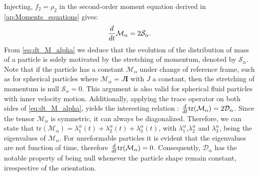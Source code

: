 Injecting, $f_2 = \rho_2$ in the second-order moment equation derived in \ref{ap:Moments_equations} gives:
\begin{equation}
    \frac{d}{d t} \mathcal{M}_\alpha=2\mathcal{S}_\alpha. 
    \label{eq:dt_M_alpha}
\end{equation}
From \ref{eq:dt_M_alpha} we deduce that the evolution of the distribution of mass of a particle is solely motivated by the stretching of momentum, denoted by $\mathcal{S}_\alpha$. 
Note that if the particle has a constant $\mathcal{M}_\alpha$ under change of reference frame, such as for spherical particles where $\mathcal{M}_\alpha= J \textbf{I}$ with $J$ a constant, then the stretching of momentum is null $\mathcal{S}_\alpha=0$.
This argument is also valid for spherical fluid particles with inner velocity motion.  
Additionally, applying the trace operator on both sides of \ref{eq:dt_M_alpha}, yields the interesting relation : $\frac{d}{d t} \text{tr}(\mathcal{M}_\alpha)=2\mathcal{D}_\alpha$.
Since the tensor $\mathcal{M}_\alpha$ is symmetric, it can always be diagonalized. 
Therefore, we can state that $\text{tr}(\mathcal{M}_\alpha) = \lambda^\alpha_1(t)+\lambda^\alpha_2(t)+\lambda^\alpha_3(t)$, with $\lambda_1^\alpha$,$\lambda_2^\alpha$ and $\lambda_3^\alpha$, being the eigenvalues of $\mathcal{M}_\alpha$.
For unreformable particles it is evident that the eigenvalues are not function of time, therefore $\frac{d}{d t} \text{tr}(\mathcal{M}_\alpha)=0$.  
Consequently, $\mathcal{D}_\alpha$ has the notable property of being null whenever the particle shape remain constant, irrespective of the orientation.




